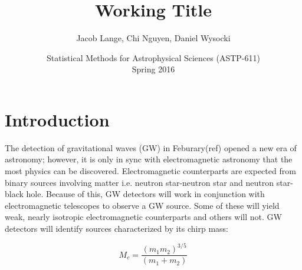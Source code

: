 \documentclass[12pt]{article}
\title{
  Working Title
}
\author{
  Jacob Lange, Chi Nguyen, Daniel Wysocki
}
\date{
  Statistical Methods for Astrophysical Sciences (ASTP-611)
  \\
  Spring 2016
}
\begin{document}
\maketitle


\begin{abstract}


\end{abstract}


\section{Introduction}
\label{sec:intro}
The detection of gravitational waves (GW) in Feburary(ref) opened a new era of astronomy; however, it is only in sync with electromagnetic astronomy that the most physics can be discovered. Electromagnetic counterparts are expected from binary sources involving matter i.e. neutron star-neutron star and neutron star-black hole. Because of this, GW detectors will work in conjunction with electromagnetic telescopes to observe a GW source. Some of these will yield weak, nearly isotropic electromagnetic counterparts and others will not. GW detectors will identify sources characterized by its chirp mass:

\begin{equation}
M_{c}=\frac{(m_{1}m_{2})^{3/5}}{(m_{1}+m_{2})}
\end{equation}
\end{document}
